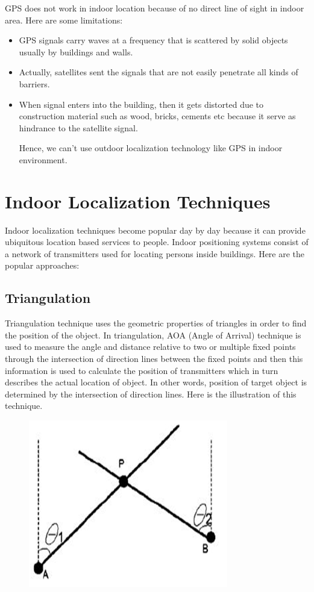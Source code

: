 GPS does not work in indoor location because of no direct line of sight in indoor area. Here are some limitations:
\begin{itemize}
\item GPS signals carry waves at a frequency that is scattered by solid objects usually by buildings and walls.
\item Actually, satellites sent the signals that are not easily penetrate all kinds of barriers.
\item	When signal enters into the building, then it gets distorted due to construction material such as wood, bricks, cements etc because it serve as hindrance to the satellite signal.\cite{IP}

Hence, we can’t use outdoor localization technology like GPS in indoor environment.
\end{itemize}


\section{Indoor Localization Techniques}
Indoor localization techniques become popular day by day because it can provide ubiquitous location based services to people. Indoor positioning systems consist of a network of transmitters used for locating persons inside buildings. Here are the popular approaches: 
\subsection{Triangulation}
Triangulation technique uses the geometric properties of triangles in order to find the position of the object. In triangulation, AOA (Angle of Arrival)\cite{Sakpere2017ASS} technique is used to measure the angle and distance relative to two or multiple fixed points through the intersection of direction lines between the fixed points and then this information is used to calculate the position of transmitters which in turn describes the actual location of object.  In other words, position of target object is determined by the intersection of direction lines. Here is the illustration of this technique.
\begin{figure}[h]
  		\centering
    		\includegraphics[scale=0.7]{./Figures/triangulation}
 		\end{figure}

